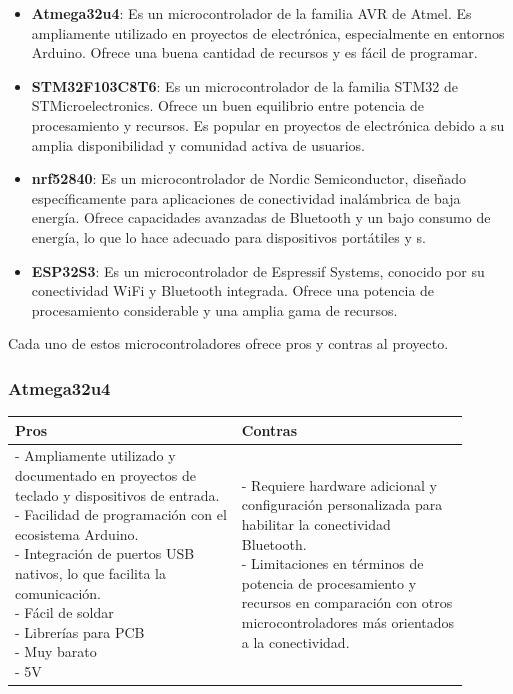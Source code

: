 \begin{itemize}
    \item \textbf{Atmega32u4}: Es un microcontrolador de la familia AVR de Atmel. Es ampliamente utilizado en proyectos de electrónica, especialmente en entornos Arduino. Ofrece una buena cantidad de recursos y es fácil de programar.
    
    \item \textbf{STM32F103C8T6}: Es un microcontrolador de la familia STM32 de STMicroelectronics. Ofrece un buen equilibrio entre potencia de procesamiento y recursos. Es popular en proyectos de electrónica debido a su amplia disponibilidad y comunidad activa de usuarios.
    
    \item \textbf{nrf52840}: Es un microcontrolador de Nordic Semiconductor, diseñado específicamente para aplicaciones de conectividad inalámbrica de baja energía. Ofrece capacidades avanzadas de \gls{Bluetooth} y un bajo consumo de energía, lo que lo hace adecuado para dispositivos portátiles y s.
    
    \item \textbf{ESP32S3}: Es un microcontrolador de Espressif Systems, conocido por su conectividad \gls{WiFi} y \gls{Bluetooth} integrada. Ofrece una potencia de procesamiento considerable y una amplia gama de recursos.
\end{itemize}
Cada uno de estos microcontroladores ofrece pros y contras al proyecto.

\subsubsection{Atmega32u4}
\begin{table}[H]
\centering
\small
\begin{tabular}{|p{0.45\linewidth}|p{0.45\linewidth}|}
\hline
\textbf{Pros} &
\textbf{Contras} \\
\hline
\parbox[t]{\linewidth}{
\vspace{0.1cm}
- Ampliamente utilizado y documentado en proyectos de teclado y dispositivos de entrada. \bigskip \\
- Facilidad de programación con el ecosistema Arduino. \bigskip \\
- Integración de puertos \gls{USB} nativos, lo que facilita la comunicación. \bigskip \\
- Fácil de soldar \bigskip \\
- Librerías para \gls{PCB} \bigskip \\
- Muy barato \bigskip \\
- 5V \\
\vspace{0.1cm}
} &
\parbox[t]{\linewidth}{
\vspace{0.1cm}
- Requiere hardware adicional y configuración personalizada para habilitar la conectividad \gls{Bluetooth}. \bigskip \\
- Limitaciones en términos de potencia de procesamiento y recursos en comparación con otros microcontroladores más orientados a la conectividad.} \bigskip \\
\hline
\end{tabular}
\end{table}

